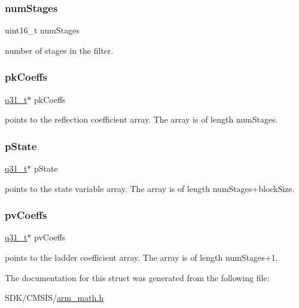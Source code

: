 \subsubsection{\texorpdfstring{num\+Stages}{numStages}}
{\footnotesize\ttfamily uint16\+\_\+t num\+Stages}

number of stages in the filter. \mbox{\label{structarm__iir__lattice__instance__q31_a9d45339bf841bf86aec57be5f70d2b01}} 
\subsubsection{\texorpdfstring{pk\+Coeffs}{pkCoeffs}}
{\footnotesize\ttfamily \mbox{\hyperlink{arm__math_8h_adc89a3547f5324b7b3b95adec3806bc0}{q31\+\_\+t}}$\ast$ pk\+Coeffs}

points to the reflection coefficient array. The array is of length num\+Stages. \mbox{\label{structarm__iir__lattice__instance__q31_adee4ba3ee8869865af7d8fa08ca913d6}} 
\subsubsection{\texorpdfstring{p\+State}{pState}}
{\footnotesize\ttfamily \mbox{\hyperlink{arm__math_8h_adc89a3547f5324b7b3b95adec3806bc0}{q31\+\_\+t}}$\ast$ p\+State}

points to the state variable array. The array is of length num\+Stages+block\+Size. \mbox{\label{structarm__iir__lattice__instance__q31_a3d7de56fe9de3458f033a64f14407533}} 
\subsubsection{\texorpdfstring{pv\+Coeffs}{pvCoeffs}}
{\footnotesize\ttfamily \mbox{\hyperlink{arm__math_8h_adc89a3547f5324b7b3b95adec3806bc0}{q31\+\_\+t}}$\ast$ pv\+Coeffs}

points to the ladder coefficient array. The array is of length num\+Stages+1. 

The documentation for this struct was generated from the following file\+:\begin{DoxyCompactItemize}
\item 
S\+D\+K/\+C\+M\+S\+I\+S/\mbox{\hyperlink{arm__math_8h}{arm\+\_\+math.\+h}}\end{DoxyCompactItemize}
